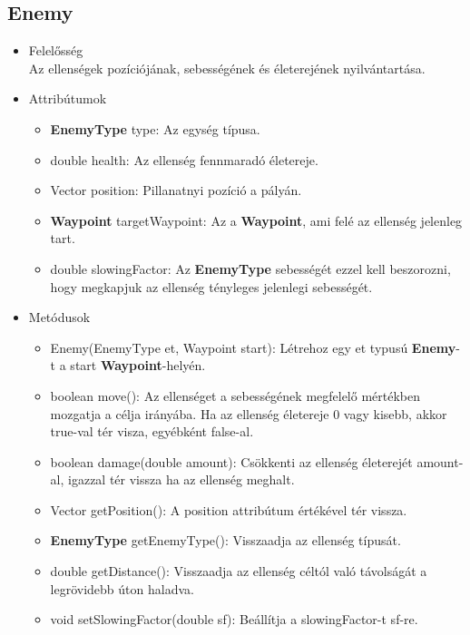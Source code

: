 \subsection{Enemy}
\begin{itemize}
\item Felelősség\\
Az ellenségek pozíciójának, sebességének és életerejének nyilvántartása.
\item Attribútumok
	\begin{itemize}
		\item \textbf{EnemyType} type: Az egység típusa.
		\item double health: Az ellenség fennmaradó életereje.
		\item Vector position: Pillanatnyi pozíció a pályán.
		\item \textbf{Waypoint} targetWaypoint: Az a \textbf{Waypoint}, ami felé az ellenség jelenleg tart.
		\item double slowingFactor: Az \textbf{EnemyType} sebességét ezzel kell beszorozni, hogy megkapjuk az ellenség tényleges jelenlegi sebességét.
	\end{itemize}
\item Metódusok
	\begin{itemize}
		\item Enemy(EnemyType et, Waypoint start): Létrehoz egy et typusú \textbf{Enemy}-t a start \textbf{Waypoint}-helyén.
		\item boolean move(): Az ellenséget a sebességének megfelelő mértékben mozgatja a célja irányába. Ha az ellenség életereje 0 vagy kisebb, akkor true-val tér visza, egyébként false-al.
		\item boolean damage(double amount): Csökkenti az ellenség életerejét amount-al, igazzal tér vissza ha az ellenség meghalt.
		\item Vector getPosition(): A position attribútum értékével tér vissza.
		\item \textbf{EnemyType} getEnemyType(): Visszaadja az ellenség típusát.
		\item double getDistance(): Visszaadja az ellenség céltól való távolságát a legrövidebb úton haladva.
		\item void setSlowingFactor(double sf): Beállítja a slowingFactor-t sf-re.
	\end{itemize}
\end{itemize}


